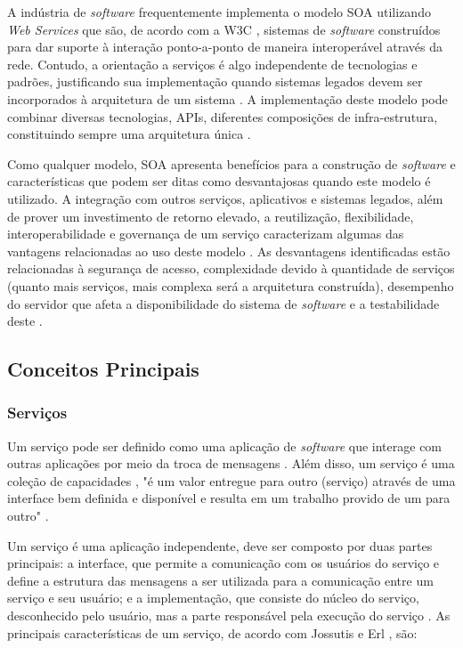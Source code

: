 A indústria de \textit{software} frequentemente implementa o modelo SOA utilizando \textit{Web Services} que são, de acordo com a W3C \cite{haas_web_2004}, sistemas de \textit{software} construídos para dar suporte à interação ponto-a-ponto de maneira interoperável através da rede. Contudo, a orientação a serviços é algo independente de tecnologias e padrões, justificando sua implementação quando sistemas legados devem ser incorporados à arquitetura de um sistema \cite{linthicum_soainrealworld_2007}. A implementação deste modelo pode combinar diversas tecnologias, APIs, diferentes composições de infra-estrutura, constituindo sempre uma arquitetura única \cite{erl_orientacaoaservico_2009}.

Como qualquer modelo, SOA apresenta benefícios para a construção de \textit{software} e características que podem ser ditas como desvantajosas quando este modelo é utilizado. A integração com outros serviços, aplicativos e sistemas legados, além de prover um investimento de retorno elevado, a reutilização, flexibilidade, interoperabilidade e governança de um serviço caracterizam algumas das vantagens relacionadas ao uso deste modelo \cite{erl_soa_2009} \cite{vantagens_desvantagens_soa}. As desvantagens identificadas estão relacionadas à segurança de acesso, complexidade devido à quantidade de serviços (quanto mais serviços, mais complexa será a arquitetura construída), desempenho do servidor que afeta a disponibilidade do sistema de \textit{software} e a testabilidade deste \cite{vantagens_desvantagens_soa}.

\subsection{Conceitos Principais}
\subsubsection{Serviços}

Um serviço pode ser definido como uma aplicação de \textit{software} que interage com outras aplicações por meio da troca de mensagens \cite{linthicum_soainrealworld_2007}. Além disso, um serviço é uma coleção de capacidades \cite{erl_orientacaoaservico_2009}, "é um valor entregue para outro (serviço) através de uma interface bem definida e disponível e resulta em um trabalho provido de um para outro" \cite{adaptive_ltd_service_2009}.

Um serviço é uma aplicação independente, deve ser composto por duas partes principais: a interface, que permite a comunicação com os usuários do serviço e define a estrutura das mensagens a ser utilizada para a comunicação entre um serviço e seu usuário; e a implementação, que consiste do núcleo do serviço, desconhecido pelo usuário, mas a parte responsável pela execução do serviço \cite{linthicum_soainrealworld_2007}. As principais características de um serviço, de acordo com Jossutis \cite{josuttis_soa_2007} e Erl \cite{erl_orientacaoaservico_2009}, são:

